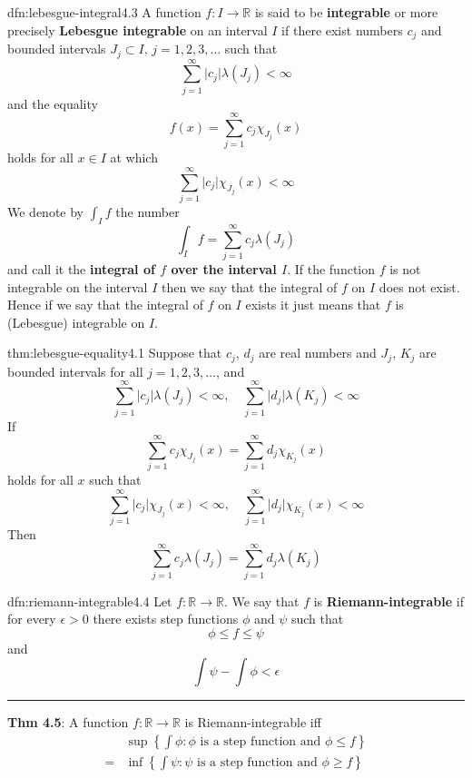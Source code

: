 \documentclass[landscape, 8pt]{extarticle}
\begin{document}
\begin{multicols}{3}
\vspace{-5pt}
\begin{dfn}{dfn:lebesgue-integral}{4.3}
	A function $f:I\to \mathbb{R}$ is said to be \textbf{integrable} or more precisely \textbf{Lebesgue integrable} on an interval $I$ if there exist numbers $c_{j}$ and bounded intervals $J_{j}\subset I,\,j=1,2,3,\dots$ such that
	\[\sum_{j=1}^{\infty} \lvert c_{j} \rvert \lambda(J_{j})<\infty\]
	and the equality
	\vspace{-5pt}
	\[f(x)=\sum_{j=1}^{\infty} c_{j}\chi_{J_{j}}(x)\]
	holds for all $x\in I$ at which
	\[\sum_{j=1}^{\infty} \lvert c_{j} \rvert \chi_{J_{j}}(x)<\infty\]
	We denote by $\int_{I}f$ the number
	\[\int _{I}f=\sum_{j=1}^{\infty} c_{j}\lambda(J_{j})\]
	and call it the \textbf{integral of $f$ over the interval $I$}.
	If the function $f$ is not integrable on the interval $I$ then we say that the integral of $f$ on $I$ does not exist. Hence if we say that the integral of $f$ on $I$ exists it just means that $f$ is (Lebesgue) integrable on $I$.
\end{dfn}

\begin{thm}{thm:lebesgue-equality}{4.1}
	Suppose that $c_{j}$, $d_{j}$ are real numbers and $J_{j}$, $K_{j}$ are bounded intervals for all $j=1,2,3,\dots$, and
	\[\sum_{j=1}^{\infty} \lvert c_{j} \rvert \lambda(J_{j})<\infty,\quad \sum_{j=1}^{\infty} \lvert d_{j} \rvert \lambda(K_{j})<\infty\]
	If
	\[\sum_{j=1}^{\infty} c_{j}\chi_{J_{j}}(x)=\sum_{j=1}^{\infty} d_{j}\chi_{K_{j}}(x)\]
	holds for all $x$ such that
	\[\sum_{j=1}^{\infty} \lvert c_{j} \rvert \chi_{J_{j}}(x)<\infty,\quad \sum_{j=1}^{\infty} \lvert d_{j} \rvert \chi_{K_{j}}(x)<\infty\]
	Then
	\[\sum_{j=1}^{\infty} c_{j}\lambda(J_{j})=\sum_{j=1}^{\infty} d_{j}\lambda(K_{j})\]
\end{thm}


\begin{dfn}{dfn:riemann-integrable}{4.4}
	\vspace{-5pt}
	Let $f : \mathbb{R} \to \mathbb{R}$. We say that $f$ is \textbf{Riemann-integrable} if for every $\epsilon > 0$ there exists step functions $\phi$ and $\psi$ such that
	\[\phi \le f \le \psi\]
	and
	\[\int \psi - \int \phi < \epsilon\]

	\noindent\rule{\textwidth}{0.2pt}
	\textbf{Thm 4.5}: A function $f : \mathbb{R}\to \mathbb{R}$ is Riemann-integrable iff
	\begin{align*}
		& \sup \left\{\int \phi : \text{$\phi$ is a step function and $\phi \le f$}\right\} \\
		= & \inf \left\{\int \psi : \text{$\psi$ is a step function and $\phi \ge f$}\right\}
	\end{align*}


\end{dfn}
\end{multicols}
\end{document}

